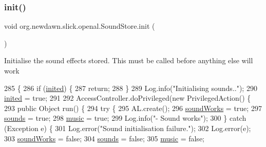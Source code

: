 \subsubsection{\texorpdfstring{init()}{init()}}
{\footnotesize\ttfamily void org.\+newdawn.\+slick.\+openal.\+Sound\+Store.\+init (\begin{DoxyParamCaption}{ }\end{DoxyParamCaption})\hspace{0.3cm}{\ttfamily [inline]}}

Initialise the sound effects stored. This must be called before anything else will work 
\begin{DoxyCode}
285                        \{
286         \textcolor{keywordflow}{if} (\mbox{\hyperlink{classorg_1_1newdawn_1_1slick_1_1openal_1_1_sound_store_ad607db06655c505a0d3aa73eb16a06e1}{inited}}) \{
287             \textcolor{keywordflow}{return};
288         \}
289         Log.info(\textcolor{stringliteral}{"Initialising sounds.."});
290         \mbox{\hyperlink{classorg_1_1newdawn_1_1slick_1_1openal_1_1_sound_store_ad607db06655c505a0d3aa73eb16a06e1}{inited}} = \textcolor{keyword}{true};
291         
292         AccessController.doPrivileged(\textcolor{keyword}{new} PrivilegedAction() \{
293             \textcolor{keyword}{public} Object run() \{
294                 \textcolor{keywordflow}{try} \{
295                     AL.create();
296                     \mbox{\hyperlink{classorg_1_1newdawn_1_1slick_1_1openal_1_1_sound_store_ae563e9c1a01e333dc2350f1450f451fd}{soundWorks}} = \textcolor{keyword}{true};
297                     \mbox{\hyperlink{classorg_1_1newdawn_1_1slick_1_1openal_1_1_sound_store_a64f1d8fb16c0b816d20abf0e695a85ec}{sounds}} = \textcolor{keyword}{true};
298                     \mbox{\hyperlink{classorg_1_1newdawn_1_1slick_1_1openal_1_1_sound_store_a7e15ee371935f6d530e4481ac9e2bd7e}{music}} = \textcolor{keyword}{true};
299                     Log.info(\textcolor{stringliteral}{"- Sound works"});
300                 \} \textcolor{keywordflow}{catch} (Exception e) \{
301                     Log.error(\textcolor{stringliteral}{"Sound initialisation failure."});
302                     Log.error(e);
303                     \mbox{\hyperlink{classorg_1_1newdawn_1_1slick_1_1openal_1_1_sound_store_ae563e9c1a01e333dc2350f1450f451fd}{soundWorks}} = \textcolor{keyword}{false};
304                     \mbox{\hyperlink{classorg_1_1newdawn_1_1slick_1_1openal_1_1_sound_store_a64f1d8fb16c0b816d20abf0e695a85ec}{sounds}} = \textcolor{keyword}{false};
305                     \mbox{\hyperlink{classorg_1_1newdawn_1_1slick_1_1openal_1_1_sound_store_a7e15ee371935f6d530e4481ac9e2bd7e}{music}} = \textcolor{keyword}{false};

\end{DoxyCode}
